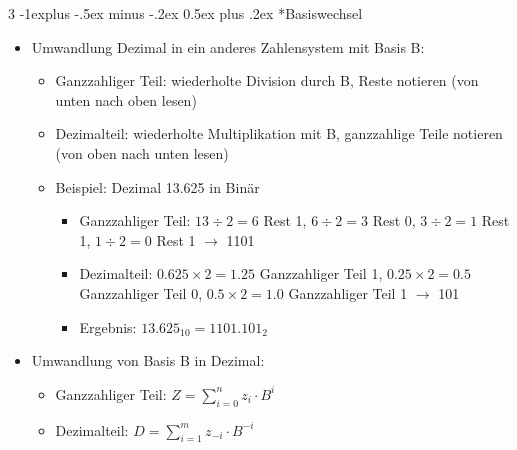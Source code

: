 \documentclass[10pt,landscape,a4paper]{article}
\makeatletter
\renewcommand{\subsection}{\@startsection{subsection}{2}{0mm}%
                                {-1explus -.5ex minus -.2ex}%
                                {0.5ex plus .2ex}%
                                {\normalfont\normalsize\bfseries}}
\makeatother
\begin{document}
\begin{multicols*}{3}
\subsection*{Basiswechsel}
\begin{itemize}
    \item Umwandlung Dezimal in ein anderes Zahlensystem mit Basis B:
    \begin{itemize}
        \item Ganzzahliger Teil: wiederholte Division durch B, Reste notieren (von unten nach oben lesen)
        \item Dezimalteil: wiederholte Multiplikation mit B, ganzzahlige Teile notieren (von oben nach unten lesen)
        \item Beispiel: Dezimal 13.625 in Binär
        \begin{itemize}
            \item Ganzzahliger Teil: \(13 \div 2 = 6\) Rest 1, \(6 \div 2 = 3\) Rest 0, \(3 \div 2 = 1\) Rest 1, \(1 \div 2 = 0\) Rest 1 $\rightarrow$ 1101
            \item Dezimalteil: \(0.625 \times 2 = 1.25\) Ganzzahliger Teil 1, \(0.25 \times 2 = 0.5\) Ganzzahliger Teil 0, \(0.5 \times 2 = 1.0\) Ganzzahliger Teil 1 $\rightarrow$ 101
            \item Ergebnis: \(13.625_{10} = 1101.101_2\)
        \end{itemize}
    \end{itemize}
    \item Umwandlung von Basis B in Dezimal:
    \begin{itemize}
        \item Ganzzahliger Teil: \(Z = \sum_{i=0}^{n} z_i \cdot B^i\)
        \item Dezimalteil: \(D = \sum_{i=1}^{m} z_{-i} \cdot B^{-i}\)
    \end{itemize}
\end{itemize}
\end{multicols*}
\end{document}

